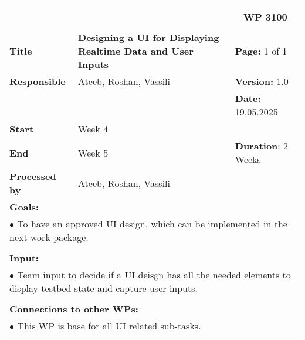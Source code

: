 \begin{table}[!h]
    \begin{center}
        \begin{tabular}{|p{}||p{}|p{}||p{}|}
            \hline
            \multicolumn{3}{|l||}{\textbf{}} & \multicolumn{1}{c|}{}\\
            \multicolumn{3}{|l||}{\textbf{}} & \multicolumn{1}{c|}{\textbf{WP 3100}}\\
            \multicolumn{3}{|l||}{\textbf{}} & \multicolumn{1}{c|}{}\\
            \hline\hline
            \textbf{Title} & \multicolumn{2}{p{.40\columnwidth}||}{\textbf{Designing a UI for Displaying Realtime Data and User Inputs}}
            & \textbf{Page:} 1 of 1\\
            \hline
            \textbf{Responsible} & \multicolumn{2}{l||}{Ateeb, Roshan, Vassili} & \textbf{Version:} 1.0\\
            \hline
            \multicolumn{3}{|l||}{} & \textbf{Date:} 19.05.2025\\
            \hline\hline
            \textbf{Start} & \multicolumn{2}{l||}{Week 4} & \\
            \hline
            \textbf{End} & \multicolumn{2}{l||}{Week 5} & \textbf{Duration}: 2 Weeks\\
            \hline\hline
            \textbf{Processed by} & \multicolumn{3}{l|}{Ateeb, Roshan, Vassili}\\
            \hline\hline
            \multicolumn{4}{|p{.95\columnwidth}|}{\textbf{Goals:}}\\
            \multicolumn{4}{|p{.95\columnwidth}|}{$\bullet$ To have an approved UI design, which can be implemented in the next work package. }\\
            \multicolumn{4}{|p{.95\columnwidth}|}{}\\
            \multicolumn{4}{|p{.95\columnwidth}|}{\textbf{Input:}}\\
            \multicolumn{4}{|p{.95\columnwidth}|}{$\bullet$ Team input to decide if a UI deisgn has all the needed elements to display testbed state and capture user inputs.}\\
            \multicolumn{4}{|p{.95\columnwidth}|}{}\\
            \multicolumn{4}{|p{.95\columnwidth}|}{\textbf{Connections to other WPs:}}\\
            \multicolumn{4}{|p{.95\columnwidth}|}{$\bullet$ This WP is base for all UI related sub-tasks.}\\


\end{tabular}
\end{center}
\end{table}

